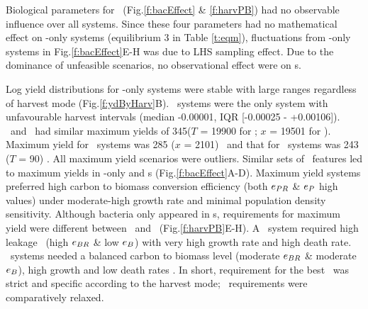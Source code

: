 \documentclass[../thesis.tex]{subfiles} %
\begin{document}
Biological parameters for \bac\ (Fig.\ref{f:bacEffect} \& \ref{f:harvPB}) had no observable influence over all systems.  Since these four parameters had no mathematical effect on \phy-only systems (equilibrium 3 in Table \ref{t:eqm}), fluctuations from \phy-only systems in Fig.\ref{f:bacEffect}E-H was due to LHS sampling effect.  Due to the dominance of unfeasible scenarios, no observational effect were on \pbs s.

Log yield distributions for \phy-only systems were stable with large ranges regardless of harvest mode (Fig.\ref{f:ydByHarv}B).  \PBN\ systems were the only system with unfavourable harvest intervals (median -0.00001, IQR [-0.00025 - +0.00106]\dxdt).  \PoH\ and \PoN\ had similar maximum yields of 345\dxdt ($T$ = 19900 for \PoN; $x$ = 19501 for \PoH).  Maximum yield for \PBH\ systems was 285 ($x$ = 2101) \dxdt\ and that for \PBN\ systems was 243 ($T$ = 90) \dxdt.  All maximum yield scenarios were outliers.  Similar sets of \phy\ features led to maximum yields in \phy-only and \pbs s (Fig.\ref{f:bacEffect}A-D).  Maximum yield systems preferred high carbon to biomass conversion efficiency (both $e_{PR}$ \& $e_P$ high values) under moderate-high growth rate and minimal population density sensitivity.  Although bacteria only appeared in \pbs s, requirements for maximum yield were different between \PBN\ and \PBH\ (Fig.\ref{f:harvPB}E-H).  A \PBN\ system required high leakage \bac\ (high $e_{BR}$ \& low $e_B$) with very high growth rate and high death rate.  \PBH\ systems needed a balanced carbon to biomass level (moderate $e_{BR}$ \& moderate $e_B$), high growth and low death rates \bac.  In short, requirement for the best \bac\ was strict and specific according to the harvest mode; \phy\ requirements were comparatively relaxed.
\end{document}
